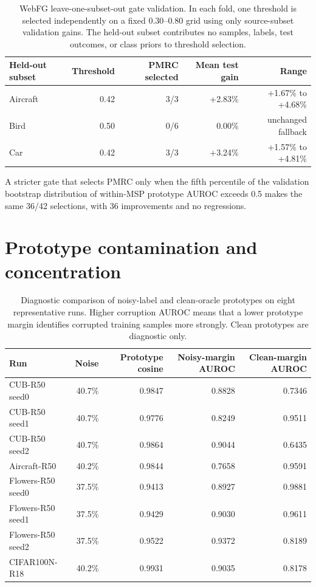 \documentclass[11pt,a4paper]{article}
\begin{document}
\begin{table}[H]
\centering
\caption{WebFG leave-one-subset-out gate validation. In each fold, one threshold is selected independently on a fixed $0.30$--$0.80$ grid using only source-subset validation gains. The held-out subset contributes no samples, labels, test outcomes, or class priors to threshold selection.}
\label{tab:gate-lowo}
\small
\setlength{\tabcolsep}{4pt}
\begin{tabular}{@{}lrrrr@{}}
\toprule
Held-out subset & Threshold & PMRC selected & Mean test gain & Range \\
\midrule
Aircraft & 0.42 & 3/3 & +2.83\% & +1.67\% to +4.68\% \\
Bird & 0.50 & 0/6 & 0.00\% & unchanged fallback \\
Car & 0.42 & 3/3 & +3.24\% & +1.57\% to +4.81\% \\
\bottomrule
\end{tabular}
\end{table}

A stricter gate that selects PMRC only when the fifth percentile of the
validation bootstrap distribution of within-MSP prototype AUROC exceeds 0.5
makes the same 36/42 selections, with 36 improvements and no regressions.

\section{Prototype contamination and concentration}

\begin{table}[H]
\centering
\caption{Diagnostic comparison of noisy-label and clean-oracle prototypes on eight representative runs. Higher corruption AUROC means that a lower prototype margin identifies corrupted training samples more strongly. Clean prototypes are diagnostic only.}
\label{tab:prototype-contamination}
\footnotesize
\setlength{\tabcolsep}{4pt}
\begin{tabular}{@{}lrrrr@{}}
\toprule
Run & Noise & Prototype cosine & Noisy-margin AUROC & Clean-margin AUROC \\
\midrule
CUB-R50 seed0 & 40.7\% & 0.9847 & 0.8828 & 0.7346 \\
CUB-R50 seed1 & 40.7\% & 0.9776 & 0.8249 & 0.9511 \\
CUB-R50 seed2 & 40.7\% & 0.9864 & 0.9044 & 0.6435 \\
Aircraft-R50 & 40.2\% & 0.9844 & 0.7658 & 0.9591 \\
Flowers-R50 seed0 & 37.5\% & 0.9413 & 0.8927 & 0.9881 \\
Flowers-R50 seed1 & 37.5\% & 0.9429 & 0.9030 & 0.9611 \\
Flowers-R50 seed2 & 37.5\% & 0.9522 & 0.9372 & 0.8189 \\
CIFAR100N-R18 & 40.2\% & 0.9931 & 0.9035 & 0.8178 \\
\bottomrule
\end{tabular}
\end{table}
\end{document}
